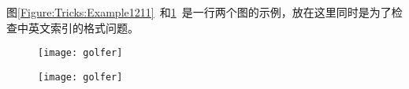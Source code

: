 




图\ref{Figure:Tricks:Example1211}~和\ref{Figure:Tricks:Example12222}~是一行两个图的示例，放在这里同时是为了检查中英文索引的格式问题。
\begin{figure}[htbp]
\centering
\begin{minipage}[t]{0.4\textwidth}
\centering
\texttt{[image: golfer]}\vspace{-5mm}
\label{Figure:Tricks:Example1211}
\end{minipage}\hspace{1cm}
\begin{minipage}[t]{0.4\textwidth}
\centering
\texttt{[image: golfer]}\vspace{-5mm}
\label{Figure:Tricks:Example12222}
\end{minipage}
\end{figure}
